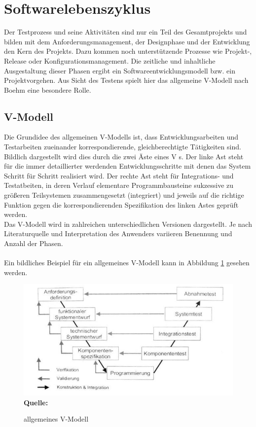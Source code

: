 \section{Softwarelebenszyklus}
\label{sec:softwarelebenszyklus}
Der Testprozess und seine Aktivitäten sind nur ein Teil des Gesamtprojekts und bilden mit dem Anforderungsmanagement, der Designphase und der Entwicklung den Kern des Projekts. Dazu kommen noch unterstützende Prozesse wie Projekt-, Release oder Konfigurationsmanagement. Die zeitliche und inhaltliche Ausgestaltung dieser Phasen ergibt ein Softwareentwicklungsmodell bzw. ein Projektvorgehen. \cite{seidl_basiswissen_2012}
Aus Sicht des Testens spielt hier das allgemeine V-Modell nach Boehm eine besondere Rolle.


\subsection{V-Modell}
\label{subsec:vmodell}
Die Grundidee des allgemeinen V-Modells ist, dass Entwicklungsarbeiten und Testarbeiten zueinander korrespondierende, gleichberechtigte Tätigkeiten sind. Bildlich dargestellt wird dies durch die zwei Äste eines \glqq V \grqq s.
Der linke Ast steht für die immer detaillierter werdenden Entwicklungsschritte mit denen das System Schritt für Schritt realisiert wird. Der rechte Ast steht für Integrations- und Testatbeiten, in deren Verlauf elementare Programmbausteine sukzessive zu größeren Teilsystemen zusammengesetzt (integriert) und jeweils auf  die richtige Funktion gegen die korrespondierenden Spezifikation des linken Astes geprüft werden.
\cite{spillner_basiswissen_2007} \\
Das V-Modell wird in zahlreichen unterschiedlichen Versionen dargestellt. 
Je nach Literaturquelle und Interpretation des Anwenders variieren Benennung und Anzahl der Phasen.
\\ \\
Ein bildliches Beispiel für ein allgemeines V-Modell kann in Abbildung \ref{fig:vModel} gesehen werden.\\

\begin{figure}[htb]
  \centering  
  \includegraphics[scale=0.8]{img/vModell.jpg}\\
  \footnotesize\sffamily\textbf{Quelle:} \cite{spillner_basiswissen_2007}
  \caption{allgemeines V-Modell}
  \label{fig:vModel}
\end{figure}


